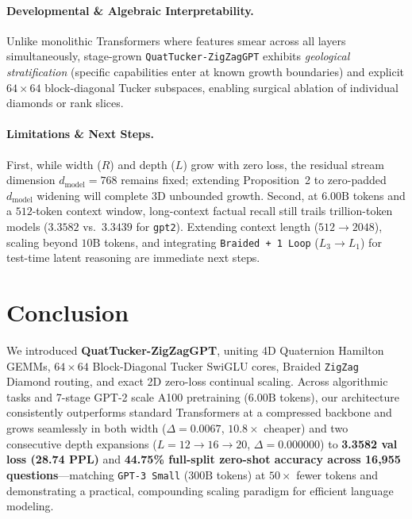 \documentclass[10pt,twocolumn]{article}
\newcommand{\citep}[1]{\cite{#1}}
\begin{document}
\paragraph{Developmental \& Algebraic Interpretability.} Unlike monolithic Transformers where features smear across all layers simultaneously, stage-grown \texttt{QuatTucker-ZigZagGPT} exhibits \emph{geological stratification} (specific capabilities enter at known growth boundaries) and explicit $64\times 64$ block-diagonal Tucker subspaces, enabling surgical ablation of individual diamonds or rank slices.

\paragraph{Limitations \& Next Steps.} First, while width ($R$) and depth ($L$) grow with zero loss, the residual stream dimension $d_{\text{model}}=768$ remains fixed; extending Proposition~2 to zero-padded $d_{\text{model}}$ widening will complete 3D unbounded growth. Second, at $6.00\text{B}$ tokens and a $512$-token context window, long-context factual recall still trails trillion-token models ($3.3582$ vs.\ $3.3439$ for \texttt{gpt2}). Extending context length ($512 \to 2048$), scaling beyond $10\text{B}$ tokens, and integrating \texttt{Braided + 1 Loop} ($L_3\to L_1$) for test-time latent reasoning \citep{geiping2025scaling} are immediate next steps.

\section{Conclusion}
We introduced \textbf{QuatTucker-ZigZagGPT}, uniting 4D Quaternion Hamilton GEMMs, $64\times 64$ Block-Diagonal Tucker SwiGLU cores, Braided \texttt{ZigZag} Diamond routing, and exact 2D zero-loss continual scaling. Across algorithmic tasks and 7-stage GPT-2 scale A100 pretraining ($6.00\text{B}$ tokens), our architecture consistently outperforms standard Transformers at a compressed backbone and grows seamlessly in both width ($\Delta=0.0067$, $10.8\times$ cheaper) and two consecutive depth expansions ($L=12 \to 16 \to 20$, $\Delta=0.000000$) to \textbf{3.3582 val loss (28.74 PPL)} and \textbf{44.75\% full-split zero-shot accuracy across 16,955 questions}---matching \texttt{GPT-3 Small} ($300\text{B}$ tokens) at $50\times$ fewer tokens and demonstrating a practical, compounding scaling paradigm for efficient language modeling.

\clearpage
\onecolumn

\end{document}
